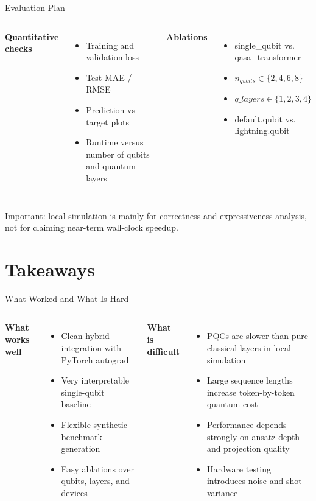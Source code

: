 \documentclass[aspectratio=169,professionalfonts]{beamer}
\begin{document}
\begin{frame}{Evaluation Plan}
\begin{columns}[T]
\textbf{Quantitative checks}
\begin{itemize}
  \item Training and validation loss
  \item Test MAE / RMSE
  \item Prediction-vs-target plots
  \item Runtime versus number of qubits and quantum layers
\end{itemize}

\textbf{Ablations}
\begin{itemize}
  \item single\_qubit vs. qasa\_transformer
  \item $n_{qubits} \in \{2,4,6,8\}$
  \item $q\_layers \in \{1,2,3,4\}$
  \item default.qubit vs. lightning.qubit
\end{itemize}
\end{columns}

\vspace{0.7em}
\alert{Important:} local simulation is mainly for correctness and expressiveness analysis, not for claiming near-term wall-clock speedup.
\end{frame}

\section{Takeaways}

\begin{frame}{What Worked and What Is Hard}
\begin{columns}[T]
\textbf{What works well}
\begin{itemize}
  \item Clean hybrid integration with PyTorch autograd
  \item Very interpretable single-qubit baseline
  \item Flexible synthetic benchmark generation
  \item Easy ablations over qubits, layers, and devices
\end{itemize}

\textbf{What is difficult}
\begin{itemize}
  \item PQCs are slower than pure classical layers in local simulation
  \item Large sequence lengths increase token-by-token quantum cost
  \item Performance depends strongly on ansatz depth and projection quality
  \item Hardware testing introduces noise and shot variance
\end{itemize}
\end{columns}
\end{frame}
\end{document}
